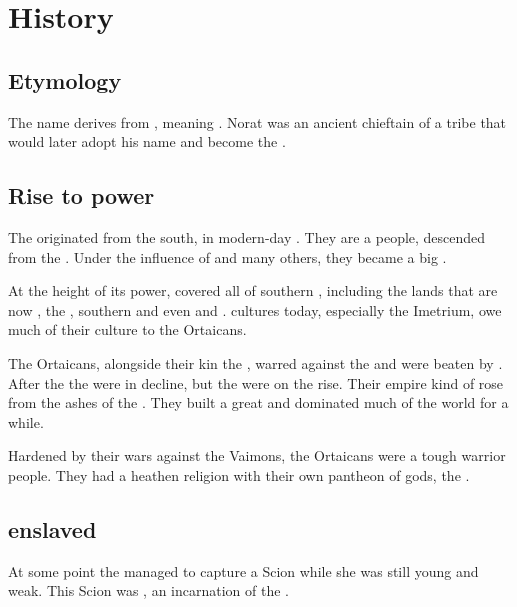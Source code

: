 \section{History}
\subsection{Etymology}
The name \quo{\Ortaican} derives from , meaning . 
Norat was an ancient chieftain of a \Mastheno{} tribe that would later adopt his name and become the \Ortaicans. 





\subsection{Rise to power}
The \Ortaicans{} originated from the south, in modern-day \Durcac. 
They are a \Tassian{} people, descended from the \Masthenon. 
Under the influence of  and many others, they became a big \bacconate. 

At the height of its power, \Ortaica{} covered all of southern , including the lands that are now {\Durcac}, the , southern  and even  and . 
\Scathaese{} cultures today, especially the Imetrium, owe much of their culture to the Ortaicans. 

The Ortaicans, alongside their kin the \Shurcos, warred against the  and were beaten by . 
After the  the \Shurco{} were in decline, but the \Ortaicans{} were on the rise. 
Their empire kind of rose from the ashes of the \Shurco. 
They built a great  and dominated much of the world for a while. 

Hardened by their wars against the Vaimons, the Ortaicans were a tough warrior people. 
They had a heathen religion with their own pantheon of gods, the .  





\subsection{\Ishicah{} enslaved}
At some point the \rethyaxes{} managed to capture a Scion while she was still young and weak. 
This Scion was , an incarnation of the \Malach{} . 

